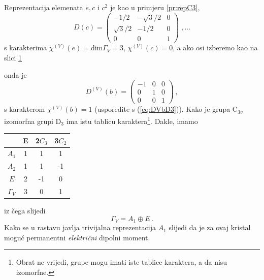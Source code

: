 Reprezentacija elemenata $e, c$ i  $c^2$ je kao u primjeru \ref{pr:repC3},
\begin{displaymath}
D(c)=
\left(
\begin{array}{ccc}
-1/2 & -\sqrt{3}/2 & 0 \\
\sqrt{3}/2 & -1/2 & 0 \\
0 & 0 & 1
\end{array}\right) \;, \ldots
\end{displaymath}
s karakterima $\chi^{(V)}(e)=\mbox{dim}\Gamma_{V}=3$, $\chi^{(V)}(c)=0$,
a ako osi izberemo kao na slici \ref{fig:C3vravnina}
\begin{figure}[ht]
    \centerline{}
    \caption{\label{fig:C3vravnina}}
\end{figure}
onda je 
\begin{displaymath}
D^{(V)}(b)=
\begin{pmatrix}
-1 & 0 & 0 \\
0 & 1 & 0 \\
0 & 0 & 1
\end{pmatrix} \,,
\end{displaymath}
s karakterom $\chi^{(V)}(b)=1$ (usporedite s (\ref{eq:DVbD3})).
Kako je grupa C$_{3v}$ izomorfna grupi D$_3$ ima istu tablicu karaktera\footnote{Obrat
ne vrijedi, grupe mogu imati iste tablice karaktera, a da nisu izomorfne.}. Dakle,
imamo 
\begin{center}
\begin{tabular}{c|ccc}
  & E & 2$C_3$  & 3$C_2$ \\ \hline
$A_1$ & 1 & 1& 1 \\
$A_2$ & 1 & 1&-1 \\
 $E$  & 2 &-1& 0 \\ \hline
 $\Gamma_V$ & 3 & 0 & 1
\end{tabular}
\end{center}
iz čega slijedi
\begin{displaymath}
   \Gamma_{V} = A_1  \oplus E \,.
\end{displaymath}
Kako se u rastavu javlja trivijalna reprezentacija $A_1$  slijedi
da je za ovaj kristal moguć permanentni \emph{električni} dipolni
moment.   

